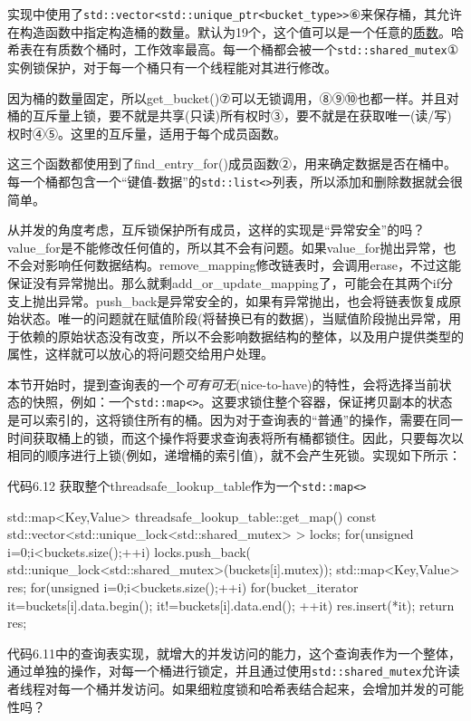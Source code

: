 实现中使用了\texttt{std::vector<std::unique\_ptr<bucket\_type>>}⑥来保存桶，其允许在构造函数中指定构造桶的数量。默认为19个，这个值可以是一个任意的\href{http://zh.wikipedia.org/zh-cn/%E7%B4%A0%E6%95%B0}{质数}。哈希表在有质数个桶时，工作效率最高。每一个桶都会被一个\texttt{std::shared\_mutex}①实例锁保护，对于每一个桶只有一个线程能对其进行修改。

因为桶的数量固定，所以get\_bucket()⑦可以无锁调用，⑧⑨⑩也都一样。并且对桶的互斥量上锁，要不就是共享(只读)所有权时③，要不就是在获取唯一(读/写)权时④⑤。这里的互斥量，适用于每个成员函数。

这三个函数都使用到了find\_entry\_for()成员函数②，用来确定数据是否在桶中。每一个桶都包含一个“键值-数据”的\texttt{std::list<>}列表，所以添加和删除数据就会很简单。

从并发的角度考虑，互斥锁保护所有成员，这样的实现是“异常安全”的吗？value\_for是不能修改任何值的，所以其不会有问题。如果value\_for抛出异常，也不会对影响任何数据结构。remove\_mapping修改链表时，会调用erase，不过这能保证没有异常抛出。那么就剩add\_or\_update\_mapping了，可能会在其两个if分支上抛出异常。push\_back是异常安全的，如果有异常抛出，也会将链表恢复成原始状态。唯一的问题就在赋值阶段(将替换已有的数据)，当赋值阶段抛出异常，用于依赖的原始状态没有改变，所以不会影响数据结构的整体，以及用户提供类型的属性，这样就可以放心的将问题交给用户处理。

本节开始时，提到查询表的一个\textit{可有可无}(nice-to-have)的特性，会将选择当前状态的快照，例如：一个\texttt{std::map<>}。这要求锁住整个容器，保证拷贝副本的状态是可以索引的，这将锁住所有的桶。因为对于查询表的“普通”的操作，需要在同一时间获取桶上的锁，而这个操作将要求查询表将所有桶都锁住。因此，只要每次以相同的顺序进行上锁(例如，递增桶的索引值)，就不会产生死锁。实现如下所示：

代码6.12 获取整个threadsafe\_lookup\_table作为一个\texttt{std::map<>}

\begin{cpp}
std::map<Key,Value> threadsafe_lookup_table::get_map() const
{
  std::vector<std::unique_lock<std::shared_mutex> > locks;
  for(unsigned i=0;i<buckets.size();++i)
  {
    locks.push_back(
      std::unique_lock<std::shared_mutex>(buckets[i].mutex));
  }
  std::map<Key,Value> res;
  for(unsigned i=0;i<buckets.size();++i)
  {
    for(bucket_iterator it=buckets[i].data.begin();
        it!=buckets[i].data.end();
        ++it)
    {
      res.insert(*it);
    }
  }
  return res;
}
\end{cpp}

代码6.11中的查询表实现，就增大的并发访问的能力，这个查询表作为一个整体，通过单独的操作，对每一个桶进行锁定，并且通过使用\texttt{std::shared\_mutex}允许读者线程对每一个桶并发访问。如果细粒度锁和哈希表结合起来，会增加并发的可能性吗？

